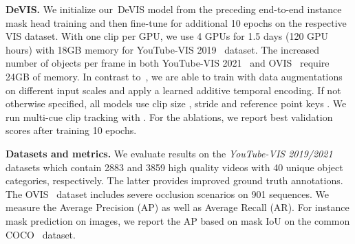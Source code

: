 \documentclass[runningheads]{llncs}
\newcommand{\evis}{\mbox{DeVIS}}
\begin{document}
\noindent\textbf{\evis{}.}
We initialize our~\evis{} model from the preceding end-to-end instance mask head training and then fine-tune for additional 10 epochs on the respective VIS dataset.
With one clip per GPU, we use 4 GPUs for 1.5 days (120 GPU hours) with 18GB memory for YouTube-VIS 2019~\cite{Yang2019vis} dataset.
The increased number of objects per frame in both YouTube-VIS 2021~\cite{Yang2019vis} and OVIS~\cite{ovis} require 24GB of memory.
In contrast to~\cite{vistr,IFC}, we are able to train with data augmentations on different input scales and apply a learned additive temporal encoding.
If not otherwise specified, all models use clip size , stride  and reference point keys .
We run multi-cue clip tracking with . 
For the ablations, we report best validation scores after training 10 epochs.




\noindent \textbf{Datasets and metrics.}
We evaluate results on the \textit{YouTube-VIS 2019/2021}~\cite{Yang2019vis} datasets which contain 2883 and 3859 high quality videos with 40 unique object categories, respectively.
The latter provides improved ground truth annotations.
The OVIS~\cite{ovis} dataset includes severe occlusion scenarios on 901 sequences.
We measure the Average Precision (AP) as well as Average Recall (AR).
For instance mask prediction on images, we report the AP based on mask IoU on the common COCO~\cite{COCO} dataset.
\end{document}
